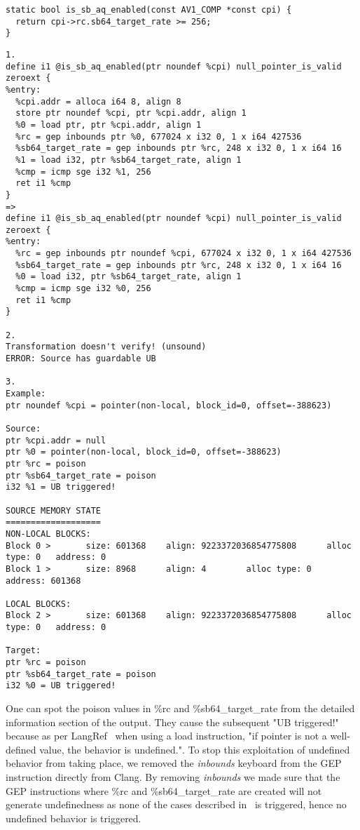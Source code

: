 \begin{lstlisting}[style=Cstyle, caption={C code for is_sb_aq_enabled}, label={lst:is_sb_aq_enabled_c_code}]
static bool is_sb_aq_enabled(const AV1_COMP *const cpi) {
  return cpi->rc.sb64_target_rate >= 256;
}
\end{lstlisting}

\begin{lstlisting}[caption={Alive2 output on is_sb_aq_enabled}, label={lst:is_sb_aq_enabled_alive}]
1.
define i1 @is_sb_aq_enabled(ptr noundef %cpi) null_pointer_is_valid zeroext {
%entry:
  %cpi.addr = alloca i64 8, align 8
  store ptr noundef %cpi, ptr %cpi.addr, align 1
  %0 = load ptr, ptr %cpi.addr, align 1
  %rc = gep inbounds ptr %0, 677024 x i32 0, 1 x i64 427536
  %sb64_target_rate = gep inbounds ptr %rc, 248 x i32 0, 1 x i64 16
  %1 = load i32, ptr %sb64_target_rate, align 1
  %cmp = icmp sge i32 %1, 256
  ret i1 %cmp
}
=>
define i1 @is_sb_aq_enabled(ptr noundef %cpi) null_pointer_is_valid zeroext {
%entry:
  %rc = gep inbounds ptr noundef %cpi, 677024 x i32 0, 1 x i64 427536
  %sb64_target_rate = gep inbounds ptr %rc, 248 x i32 0, 1 x i64 16
  %0 = load i32, ptr %sb64_target_rate, align 1
  %cmp = icmp sge i32 %0, 256
  ret i1 %cmp
}

2.
Transformation doesn't verify! (unsound)
ERROR: Source has guardable UB

3.
Example:
ptr noundef %cpi = pointer(non-local, block_id=0, offset=-388623)

Source:
ptr %cpi.addr = null
ptr %0 = pointer(non-local, block_id=0, offset=-388623)
ptr %rc = poison
ptr %sb64_target_rate = poison
i32 %1 = UB triggered!

SOURCE MEMORY STATE
===================
NON-LOCAL BLOCKS:
Block 0 >       size: 601368    align: 9223372036854775808      alloc type: 0   address: 0
Block 1 >       size: 8968      align: 4        alloc type: 0   address: 601368

LOCAL BLOCKS:
Block 2 >       size: 601368    align: 9223372036854775808      alloc type: 0   address: 0

Target:
ptr %rc = poison
ptr %sb64_target_rate = poison
i32 %0 = UB triggered!
\end{lstlisting}

One can spot the poison values in \%rc and \%sb64_target_rate from the detailed
information section of the output. They cause the subsequent "UB triggered!"
because as per LangRef~\cite{load-semantics} when using a load instruction, "if
pointer is not a well-defined value, the behavior is undefined.". To stop this
exploitation of undefined behavior from taking place, we removed the
\textit{inbounds} keyboard from the GEP instruction directly from Clang. By
removing \textit{inbounds} we made sure that the GEP instructions where \%rc and
\%sb64_target_rate are created will not generate undefinedness as none of the
cases described in~\cite{getelementptr-semantics} is triggered, hence no
undefined behavior is triggered.

